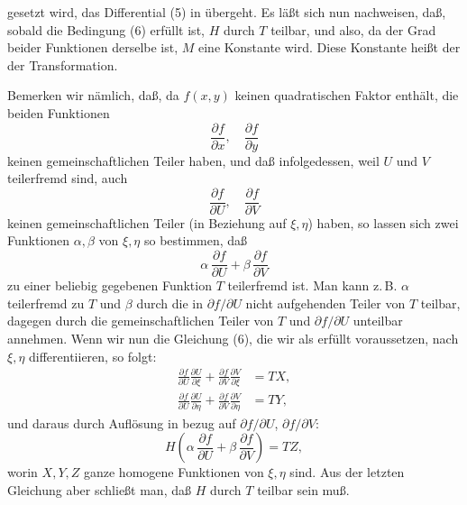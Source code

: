 gesetzt wird, das Differential (5) in
übergeht. Es läßt sich nun nachweisen, daß, sobald die Bedingung (6)
erfüllt ist, $H$ durch $T$ teilbar, und also, da der Grad beider
Funktionen derselbe ist, $M$ eine Konstante wird. Diese Konstante heißt
der  der Transformation.

Bemerken wir nämlich, daß, da $f(x,y)$ keinen quadratischen Faktor
enthält, die beiden Funktionen
\[
\frac{\partial f}{\partial x}, \quad \frac{\partial f}{\partial y}
\]
keinen gemeinschaftlichen Teiler haben, und daß infolgedessen, weil $U$
und $V$ teilerfremd sind, auch
\[
\frac{\partial f}{\partial U}, \quad \frac{\partial f}{\partial V}
\]
keinen gemeinschaftlichen Teiler (in Beziehung auf $\xi,\eta$) haben, so
lassen sich zwei Funktionen $\alpha,\beta$ von $\xi,\eta$ so bestimmen,
daß
\[
\alpha\,\frac{\partial f}{\partial U} + \beta\,\frac{\partial f}{\partial V}
\]
zu einer beliebig gegebenen Funktion $T$ teilerfremd ist. Man kann z.\,B.
$\alpha$ teilerfremd zu $T$ und $\beta$ durch die in $\partial f/\partial U$
nicht aufgehenden Teiler von $T$ teilbar, dagegen durch die
gemeinschaftlichen Teiler von $T$ und $\partial f/\partial U$ unteilbar
annehmen. Wenn wir nun die Gleichung (6), die wir als erfüllt
voraussetzen, nach $\xi,\eta$ differentiieren, so folgt:
\[
\begin{aligned}
\frac{\partial f}{\partial U}\frac{\partial U}{\partial \xi} + \frac{\partial f}{\partial V}\frac{\partial V}{\partial \xi} &= TX,\\
\frac{\partial f}{\partial U}\frac{\partial U}{\partial \eta} + \frac{\partial f}{\partial V}\frac{\partial V}{\partial \eta} &= TY,
\end{aligned}
\]
und daraus durch Auflösung in bezug auf $\partial f/\partial U$,
$\partial f/\partial V$:
\[
H\left(\alpha\,\frac{\partial f}{\partial U} + \beta\,\frac{\partial f}{\partial V}\right) = TZ,
\]
worin $X,Y,Z$ ganze homogene Funktionen von $\xi,\eta$ sind. Aus der
letzten Gleichung aber schließt man, daß $H$ durch $T$ teilbar sein muß.
